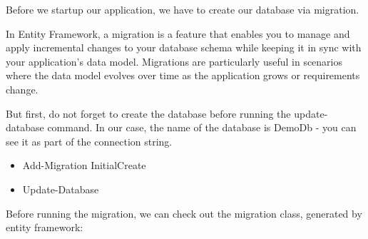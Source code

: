 Before we startup our application, we have to create our database via migration. 

In Entity Framework, a migration is a feature that enables you to manage and apply incremental changes to your database schema while keeping it in sync with your application's data model. Migrations are particularly useful in scenarios where the data model evolves over time as the application grows or requirements change.

But first, do not forget to create the database before running the update-database command. In our case, the name of the database is DemoDb - you can see it as part of the connection string.

\begin{itemize}
\item Add-Migration InitialCreate

\item Update-Database
\end{itemize}

Before running the migration, we can check out the migration class, generated by entity framework:

